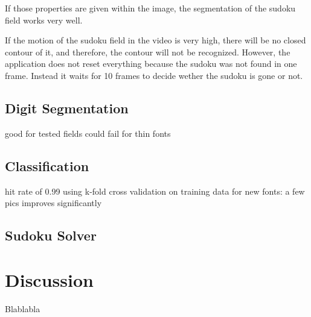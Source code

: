 \documentclass[
a4paper,     %
12pt         %
]{scrartcl}  %
\begin{document}
If those properties are given within the image, the segmentation of the sudoku field works very well. 

If the motion of the sudoku field in the video is very high, there will be no closed contour of it,
and therefore, the contour will not be recognized. However, the application does not reset everything because
the sudoku was not found in one frame. Instead it waits for 10 frames to decide wether the sudoku is gone
or not.

\subsection{Digit Segmentation}

good for tested fields
could fail for thin fonts

\subsection{Classification}

hit rate of 0.99 using k-fold cross validation on training data
for new fonts: a few pics improves significantly

\subsection{Sudoku Solver}

\section{Discussion}

Blablabla



% 

% 
\end{document}
